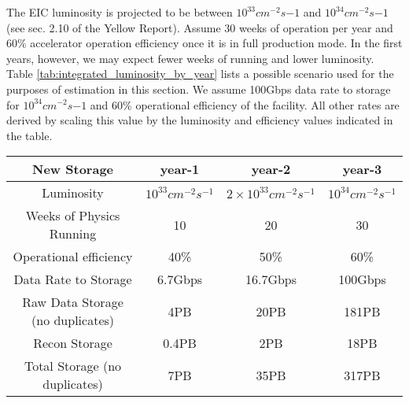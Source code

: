 


The EIC luminosity is projected to be between $10^{33}cm^{-2}s{-1}$ and $10^{34}cm^{-2}s{-1}$ (see sec. 2.10 of the Yellow Report\cite{YellowReport}). Assume 30 weeks of operation per year and 60\% accelerator operation efficiency once it is in full production mode. In the first years, however, we may expect fewer weeks of running and lower luminosity. Table \ref{tab:integrated_luminosity_by_year} lists a possible scenario used for the purposes of estimation in this section. We assume 100Gbps data rate to storage for $10^{34}cm^{-2}s{-1}$ and 60\% operational efficiency of the facility. All other rates are derived by scaling this value by the luminosity and efficiency values indicated in the table.


\begin{table*}[htb]
    \centering
    \begin{tabular}{c|c|c|c}
        \hline
        \hline
         \textbf{New Storage}       & year-1                & year-2                  & year-3                \\
        \hline
         Luminosity              & $10^{33}cm^{-2}s^{-1}$ & $2\times10^{33}cm^{-2}s^{-1}$ & $10^{34}cm^{-2}s^{-1}$ \\
         \hline
         Weeks of Physics Running        & 10                    & 20                      & 30                    \\
         \hline
         Operational efficiency    & 40\%                  & 50\%                    & 60\%                  \\
         \hline
         Data Rate to Storage    & 6.7Gbps               & 16.7Gbps                & 100Gbps               \\
         \hline
         Raw Data Storage (no duplicates) & 4PB          & 20PB                    & 181PB                 \\
         \hline
         Recon Storage          & 0.4PB                  & 2PB                    & 18PB                   \\ %
         \hline
         Total Storage (no duplicates) & 7PB           & 35PB                   & 317PB                  \\
         \hline
   \end{tabular}
    \caption{Estimate of raw data tape storage needed for first 3 years of EIC running (ECCE only). Values are estimates assuming ramp up to full luminosity  by year 3. Numbers for the first two years are estimated for the purposes of this exercise and do not come from an external source. n.b. each value represents \emph{only} the needs for data produced in that year and \emph{not} a cumulative total.}
    \label{tab:integrated_luminosity_by_year}
\end{table*}

